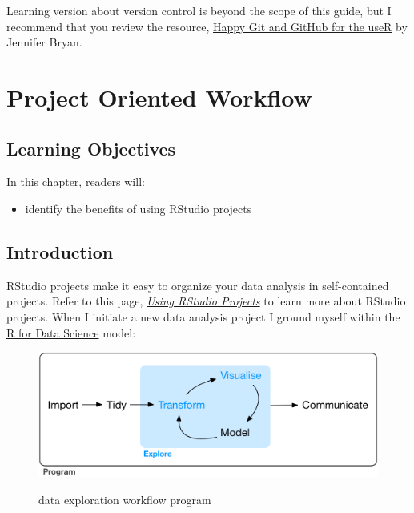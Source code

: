 \documentclass[
  letterpaper,
  DIV=11,
  numbers=noendperiod]{scrreprt}
\providecommand{\tightlist}{%
  \setlength{\itemsep}{0pt}\setlength{\parskip}{0pt}}\usepackage{longtable,booktabs,array}
\begin{document}
Learning version about version control is beyond the scope of this
guide, but I recommend that you review the resource,
\href{https://happygitwithr.com/index.html}{Happy Git and GitHub for the
useR} by Jennifer Bryan.


\hypertarget{project-oriented-workflow-1}{%
\chapter{Project Oriented Workflow}\label{project-oriented-workflow-1}}

\hypertarget{learning-objectives-2}{%
\section{Learning Objectives}\label{learning-objectives-2}}

In this chapter, readers will:

\begin{itemize}
\tightlist
\item
  identify the benefits of using RStudio projects
\end{itemize}

\hypertarget{introduction-2}{%
\section{Introduction}\label{introduction-2}}

RStudio projects make it easy to organize your data analysis in
self-contained projects. Refer to this page,
\href{https://support.rstudio.com/hc/en-us/articles/200526207-Using-Projects}{\emph{Using
RStudio Projects}} to learn more about RStudio projects. When I initiate
a new data analysis project I ground myself within the
\href{https://r4ds.had.co.nz/index.html}{R for Data Science} model:

\begin{figure}

{\centering 

\href{https://r4ds.had.co.nz/explore-intro.html}{\includegraphics{./assets/data-science-explore.png}}

}

\caption{data exploration workflow program}

\end{figure}
\end{document}
